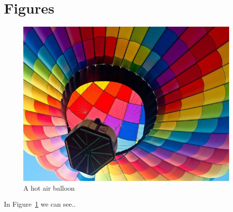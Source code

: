 \section{Figures}\label{sec:figures}

\begin{figure}
    \centering
    \includegraphics[width=0.4\linewidth,height=\textheight,keepaspectratio]{images/hot-air-balloon.jpg}
    \caption{A hot air balloon}\label{fig:logo}
\end{figure}

In Figure~\ref{fig:logo} we can see..
